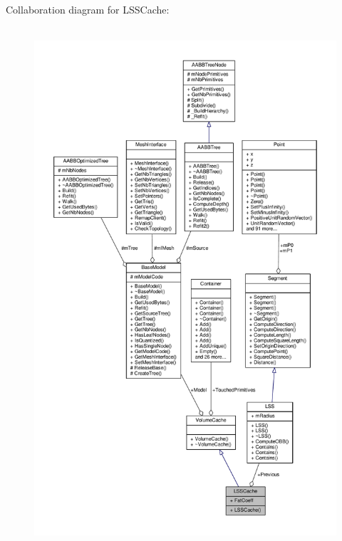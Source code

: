 Collaboration diagram for L\+S\+S\+Cache\+:
\nopagebreak
\begin{figure}[H]
\begin{center}
\leavevmode
\includegraphics[height=550pt]{dc/d3f/structLSSCache__coll__graph}
\end{center}
\end{figure}
